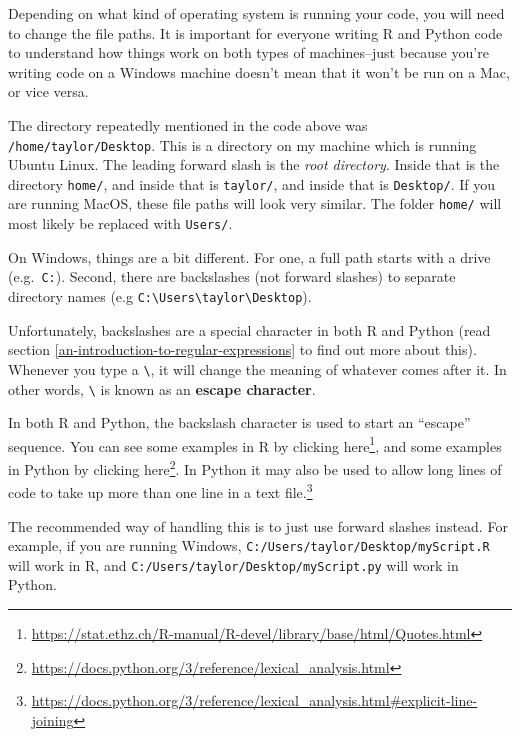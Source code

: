 \documentclass[12pt,krantz2]{krantz}
\renewcommand{\href}[2]{#2\footnote{\url{#1}}}
\begin{document}
Depending on what kind of operating system is running your code, you will need to change the file paths. It is important for everyone writing R and Python code to understand how things work on both types of machines--just because you're writing code on a Windows machine doesn't mean that it won't be run on a Mac, or vice versa.

The directory repeatedly mentioned in the code above was \texttt{/home/taylor/Desktop}. This is a directory on my machine which is running Ubuntu Linux. The leading forward slash is the \emph{root directory}. Inside that is the directory \texttt{home/}, and inside that is \texttt{taylor/}, and inside that is \texttt{Desktop/}. If you are running MacOS, these file paths will look very similar. The folder \texttt{home/} will most likely be replaced with \texttt{Users/}.

On Windows, things are a bit different. For one, a full path starts with a drive (e.g.~\texttt{C:}). Second, there are backslashes (not forward slashes) to separate directory names (e.g \texttt{C:\textbackslash{}Users\textbackslash{}taylor\textbackslash{}Desktop}).

Unfortunately, backslashes are a special character in both R and Python (read section \ref{an-introduction-to-regular-expressions} to find out more about this). Whenever you type a \texttt{\textbackslash{}}, it will change the meaning of whatever comes after it. In other words, \texttt{\textbackslash{}} is known as an \textbf{escape character}.

\begin{rmd-details}
In both R and Python, the backslash character is used to start an ``escape'' sequence. You can see some examples in R by clicking \href{https://stat.ethz.ch/R-manual/R-devel/library/base/html/Quotes.html}{here}, and some examples in Python by clicking \href{https://docs.python.org/3/reference/lexical_analysis.html}{here}. In Python it may also be used to \href{https://docs.python.org/3/reference/lexical_analysis.html\#explicit-line-joining}{allow long lines of code to take up more than one line in a text file.}

\end{rmd-details}

The recommended way of handling this is to just use forward slashes instead. For example, if you are running Windows, \texttt{C:/Users/taylor/Desktop/myScript.R} will work in R, and \texttt{C:/Users/taylor/Desktop/myScript.py} will work in Python.
\end{document}
